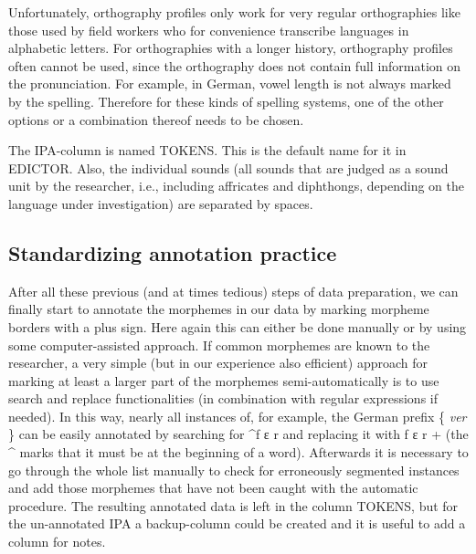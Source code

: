 \documentclass[
  a4paper,
  14pt,
  oneside,
  tablecaptionabove
]{scrbook}
\begin{document}
Unfortunately, orthography profiles only work for very regular
orthographies like those used by field workers who for convenience
transcribe languages in alphabetic letters. For orthographies with a
longer history, orthography profiles often cannot be used, since the
orthography does not contain full information on the pronunciation. For
example, in German, vowel length is not always marked by the spelling.
Therefore for these kinds of spelling systems, one of the other options
or a combination thereof needs to be chosen.

The IPA-column is named TOKENS. This is the default name for it in
EDICTOR. Also, the individual sounds (all sounds that are judged as a
sound unit by the researcher, i.e., including affricates and diphthongs,
depending on the language under investigation) are separated by spaces.

\subsection*{Standardizing annotation
practice}

After all these previous (and at times tedious) steps of data
preparation, we can finally start to annotate the morphemes in our data
by marking morpheme borders with a plus sign. Here again this can either
be done manually or by using some computer-assisted approach. If common
morphemes are known to the researcher, a very simple (but in our
experience also efficient) approach for marking at least a larger part
of the morphemes semi-automatically is to use search and replace
functionalities (in combination with regular expressions if needed). In
this way, nearly all instances of, for example, the German prefix \{
\emph{ver} \} can be easily annotated by searching for { \^{}f ɛ r } and
replacing it with { f ɛ r + } (the { \^{} } marks that it must be at the
beginning of a word). Afterwards it is necessary to go through the whole
list manually to check for erroneously segmented instances and add those
morphemes that have not been caught with the automatic procedure. The
resulting annotated data is left in the column TOKENS, but for the
un-annotated IPA a backup-column could be created and it is useful to
add a column for notes.
\end{document}
